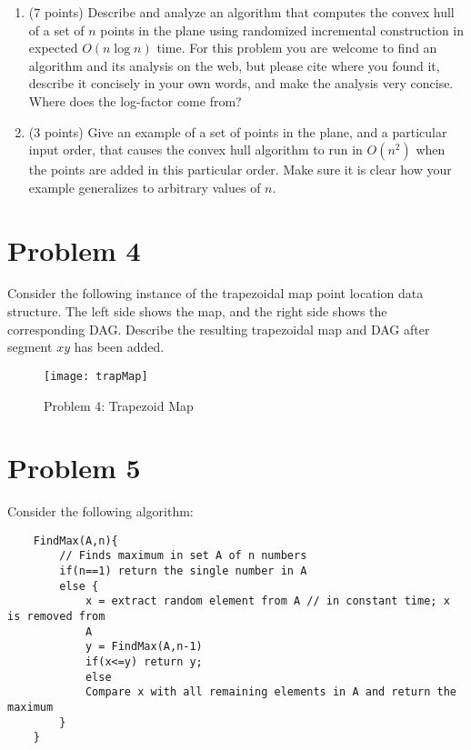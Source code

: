 \documentclass[11pt]{article}
\begin{document}
\begin{enumerate}

    \item (7 points) Describe and analyze an algorithm that computes the
        convex hull of a set of $n$ points in the plane using randomized
        incremental construction in expected $O(n \log n)$ time. For this
        problem you are welcome to find an algorithm and its analysis on the
        web, but please cite where you found it, describe it concisely in
        your own words, and make the analysis very concise. Where does the
        log-factor come from?

    \item (3 points) Give an example of a set of points in the plane, and a
        particular input order, that causes the convex hull algorithm to run in
        $O(n^2)$ when the points are added in this particular order. Make sure it
        is clear how your example generalizes to arbitrary values of $n$.

\end{enumerate}
\answer

\newpage
\section*{Problem 4}

Consider the following instance of the trapezoidal map point location data
structure. The left side shows the map, and the right side shows the
corresponding DAG. Describe the resulting trapezoidal map and DAG after segment
$xy$ has been added.

\begin{figure}[h]
    \centering
    \texttt{[image: trapMap]}
    \caption{Problem 4: Trapezoid Map}
\end{figure}
\answer

\newpage
\section*{Problem 5}

Consider the following algorithm:

\begin{verbatim}
    FindMax(A,n){
        // Finds maximum in set A of n numbers
        if(n==1) return the single number in A
        else {
            x = extract random element from A // in constant time; x is removed from
            A
            y = FindMax(A,n-1)
            if(x<=y) return y;
            else
            Compare x with all remaining elements in A and return the maximum
        }
    }
\end{verbatim}
\end{document}
